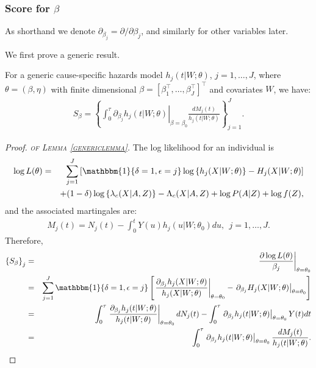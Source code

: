 \documentclass[11pt]{article}
\newcommand{\ee}{\end{eqnarray}}
\newcommand{\eqnn}{\begin{eqnarray*}}
\newcommand{\een}{\end{eqnarray*}}
\newcommand{\be}{\begin{eqnarray}}
\begin{document}
\subsubsection{Score for $\beta$}

As shorthand we denote $ \partial_{\beta_j} = \partial/ \partial{\beta_j}$, and similarly for other variables later. 

We first prove a generic result.
\begin{lemmas}\label{genericlemma}
For a generic cause-specific hazards model $h_j(t | W ; \theta)$, $j=1,\ldots,J$, where $\theta=(\beta, \eta)$ with finite dimensional  $\beta=[\beta_1^\top,\ldots,\beta_J^\top]^\top$  and covariates $W$, we have: 
\be
S_\beta=\left\{\int_0^\tau \left.\partial_{\beta_j}h_j(t | W ; \theta)\right|_{\beta=\beta_0}\frac{dM_j(t)}{h_j(t | W ; \theta)}\right\}_{j=1}^J.
\ee
\end{lemmas}
\newenvironment{newproof50}{\begin{proof}\textsc{\emph{of Lemma \ref{genericlemma}.}}}{\end{proof}}
\begin{newproof50}
The log likelihood for an individual is
\eqnn
\log L(\theta)&=&\sum_{j=1}^J\left[\mathbbm{1}\{\delta=1, \epsilon=j\}\log\left\{h_j(X | W ; \theta)\right\}-H_j(X | W; \theta)\right]\\&&+(1-\delta)\log\left\{\lambda_c(X | A,Z)\right\}-\Lambda_c(X | A,Z)+\log P(A| Z)+ \log f(Z),\nonumber
\een
and the associated martingales are:
\be
M_j(t)=N_j(t)- \int_0^t Y(u) h_j(u | W ; \theta_0) du, \ \ j=1,\ldots,J.
\ee
Therefore, %
\eqnn
\left\{S_{\beta}\right\}_j&=&\left.\frac{\partial\log L(\theta)}{\beta_j}\right|_{\theta=\theta_{0}}\\
&=&\sum_{j=1}^J{\mathbbm{1}\{\delta=1, \epsilon=j\}}\left[\left.\frac{\partial_{\beta_j}h_j(X | W ; \theta)}{h_j(X | W ; \theta)}\right|_{\theta=\theta_{0}}-\left.\partial_{\beta_j}H_j(X | W; \theta)\right|_{\theta=\theta_{0}}\right]\\
&=&\int_0^\tau\left.\frac{\partial_{\beta_j}h_j(t | W ; \theta)}{h_j(t | W ; \theta)}\right|_{\theta=\theta_{0}}dN_j(t)-\int_0^\tau\left.\partial_{\beta_j}h_j(t | W; \theta)\right|_{\theta=\theta_{0}}Y(t)dt\\
&=&\int_0^\tau \left.\partial_{\beta_j}h_j(t | W ; \theta)\right|_{\theta=\theta_0}\frac{dM_j(t)}{h_j(t | W ; \theta)}.
\een
\end{newproof50}
\end{document}
